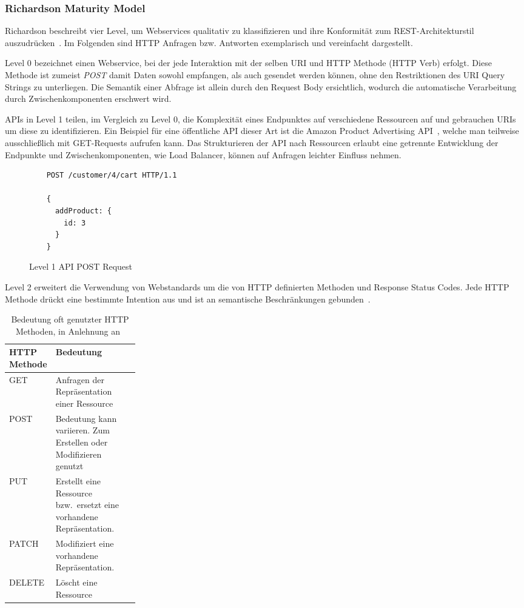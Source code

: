 \subsubsection{Richardson Maturity Model}
Richardson beschreibt vier Level, um Webservices qualitativ zu klassifizieren und ihre Konformität zum REST-Architekturstil auszudrücken~\cite[vgl.][]{Desrosiers}.
Im Folgenden sind HTTP Anfragen bzw. Antworten exemplarisch und vereinfacht dargestellt.
\par
Level 0 bezeichnet einen Webservice, bei der jede Interaktion mit der selben URI und HTTP Methode (HTTP Verb) erfolgt.
Diese Methode ist zumeist \emph{POST} damit Daten sowohl empfangen, als auch gesendet werden können, ohne den Restriktionen des URI Query Strings zu unterliegen.
Die Semantik einer Abfrage ist allein durch den Request Body ersichtlich, wodurch die automatische Verarbeitung durch Zwischenkomponenten erschwert wird.
\par
APIs in Level 1 teilen, im Vergleich zu Level 0, die Komplexität eines Endpunktes auf verschiedene Ressourcen auf und gebrauchen URIs um diese zu identifizieren.
Ein Beispiel für eine öffentliche API dieser Art ist die Amazon Product Advertising API~\cite{Amzn}, welche man teilweise ausschließlich mit GET-Requests aufrufen kann.
Das Strukturieren der API nach Ressourcen erlaubt eine getrennte Entwicklung der Endpunkte und Zwischenkomponenten, wie Load Balancer, können auf Anfragen leichter Einfluss nehmen.
\begin{figure}[h]
  \centering
  \begin{verbatim}
    POST /customer/4/cart HTTP/1.1
  
    {
      addProduct: {
        id: 3
      }
    }
  \end{verbatim}
  \caption{Level 1 API POST Request}\label{code:lvl1}
\end{figure}
\par
Level 2 erweitert die Verwendung von Webstandards um die von HTTP definierten Methoden und Response Status Codes.
Jede HTTP Methode drückt eine bestimmte Intention aus und ist an semantische Beschränkungen gebunden~\cite[vgl.][21ff.]{HTTP}.
{
\begin{table}[h!]
  \begin{center}
    \caption{Bedeutung oft genutzter HTTP Methoden, in Anlehnung an~\cite[22]{HTTP}}\label{tab:HTTP Methods}
    \begin{tabularx}{\linewidth}{m{0.25\linewidth}X}
      \rowcolor{blue!40!white!50!black!10}\textbf{HTTP Methode} & \textbf{Bedeutung}\\
      \midrule
      GET & Anfragen der Repräsentation einer Ressource\\
      POST & Bedeutung kann variieren. Zum Erstellen oder Modifizieren genutzt\\
      PUT & Erstellt eine Ressource bzw.\ ersetzt eine vorhandene Repräsentation.\\
      PATCH & Modifiziert eine vorhandene Repräsentation.\\
      DELETE & Löscht eine Ressource\\
    \end{tabularx}
  \end{center}
\end{table}
}
